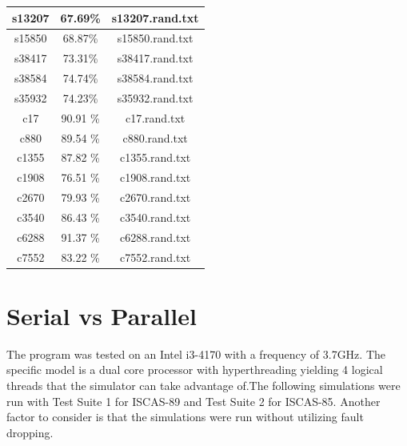 \documentclass[a4paper,12pt]{article}
\begin{document}
\begin{center}
\begin{tabular}{||c c c||}
\hline
s13207 & 67.69\% & s13207.rand.txt \\
\hline
s15850 & 68.87\% & s15850.rand.txt \\
\hline
s38417 & 73.31\% & s38417.rand.txt \\
\hline
s38584 & 74.74\% & s38584.rand.txt \\
\hline
s35932 & 74.23\% & s35932.rand.txt \\
\hline
c17 & 90.91 \%  & c17.rand.txt \\ 
\hline
c880 & 89.54 \%  & c880.rand.txt \\ 
\hline
c1355 & 87.82 \%  & c1355.rand.txt \\ 
\hline
c1908 & 76.51 \%  & c1908.rand.txt \\ 
\hline
c2670 & 79.93 \%  & c2670.rand.txt \\ 
\hline
c3540 & 86.43 \%  & c3540.rand.txt \\ 
\hline
c6288 & 91.37 \%  & c6288.rand.txt \\ 
\hline
c7552 & 83.22 \%  & c7552.rand.txt \\ 
\hline
\end{tabular}
\end{center}



\clearpage

\section*{Serial vs Parallel}
The program was tested on an Intel i3-4170 with a frequency of 3.7GHz. The specific model is a dual core processor with hyperthreading yielding 4 logical threads that the simulator can take advantage of.The following simulations were run with Test Suite 1 for ISCAS-89 and Test Suite 2 for ISCAS-85. Another factor to consider is that the simulations were run without utilizing fault dropping.
\end{document}
